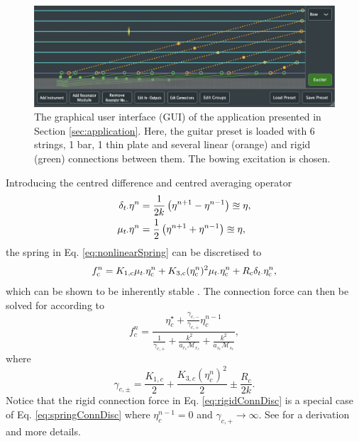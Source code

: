 \documentclass{article}
\begin{document}
\begin{figure}[t] %
    \centering
    \includegraphics[width = \textwidth]{GUI.png}
    \caption{The graphical user interface (GUI) of the application presented in Section \ref{sec:application}. Here, the guitar preset is loaded with 6 strings, 1 bar, 1 thin plate and several linear (orange) and rigid (green) connections between them. The bowing excitation is chosen.}
    \label{fig:gui}
\end{figure}
Introducing the centred difference and centred averaging operator
\begin{align}
    \delta_{t\cdot} \eta^n &= \frac{1}{2k}\left(\eta^{n+1}-\eta^{n-1}\right)\approxeq \eta,\\
    \mu_{t\cdot} \eta^n &= \frac{1}{2}\left(\eta^{n+1}+\eta^{n-1}\right)\approxeq \eta,
\end{align}
the spring in Eq. \eqref{eq:nonlinearSpring} can be discretised to
\begin{equation}\label{eq:nonlinearSpringDisc}
    f_{\text{c}}^n = K_{1,\text{c}}\mu_{t\cdot}\eta_{\text{c}}^n + K_{3,\text{c}}(\eta_{\text{c}}^n)^2\mu_{t\cdot}\eta_{\text{c}}^n + R_{\text{c}}\delta_{t\cdot} \eta_{\text{c}}^n,
\end{equation}
which can be shown to be inherently stable \cite{theBible, Bilbao2009Modular}. The connection force can then be solved for according to
\begin{equation}\label{eq:springConnDisc}
    f_c^n = \frac{\eta_c^\star + \frac{\gamma_{c,-}}{\gamma_{c,+}}\eta_c^{n-1}}{\frac{1}{\gamma_{c,+}} + \frac{k^2}{a_{r_c}\mathcal{M}_{r_c}}+ \frac{k^2}{a_{s_c}\mathcal{M}_{s_c}}},
\end{equation}
where 
\begin{equation}
    \gamma_{c,\pm} = \frac{K_{1, c}}{2} + \frac{K_{3,c}(\eta_c^n)^2}{2} \pm \frac{R_c}{2k}.
\end{equation}
Notice that the rigid connection force in Eq. \eqref{eq:rigidConnDisc} is a special case of Eq. \eqref{eq:springConnDisc} where $\eta^{n-1}_c = 0$ and $\gamma_{c, +} \rightarrow \infty$. See \cite[Ch. 11]{WillemsenThesis} for a derivation and more details.
\end{document}
